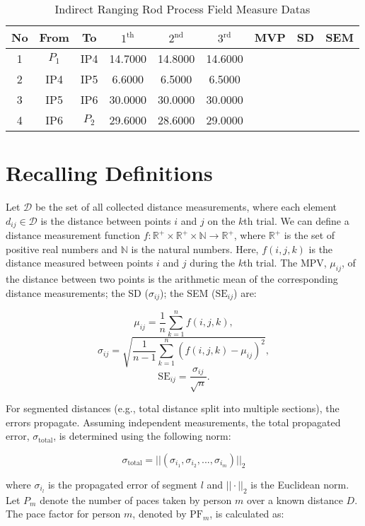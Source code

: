 \documentclass[12pt]{article}
\begin{document}
\begin{table}[ht!]
\centering
\begin{tabular}{ccccccccc}
\hline
No & From & To  & $1^{\operatorname{th}}$  & $2^{\operatorname{nd}}$  & $3^{\operatorname{rd}}$   & MVP & SD & SEM \\
\hline
1 & $P_1$ & IP4 & 14.7000 & 14.8000& 14.6000 &  &  &  \\
2 & IP4 & IP5 & 6.6000 & 6.5000 & 6.5000 &  &  &  \\
3 & IP5 & IP6 & 30.0000 & 30.0000 & 30.0000 &  &  &   \\
4 & IP6 & $P_2$ & 29.6000 & 28.6000 & 29.0000 &  &  &  \\
\hline
\end{tabular}
\caption{Indirect Ranging Rod Process Field Measure Datas} 
\end{table}


\section*{Recalling Definitions}

Let $\mathcal{D}$ be the set of all collected distance measurements, where each element $d_{ij} \in \mathcal{D}$ is the distance between points $i$ and $j$ on the $k$th trial. We can define a distance measurement function $f: \mathbb{R}^+ \times \mathbb{R}^+ \times \mathbb{N} \rightarrow \mathbb{R}^+$, where $\mathbb{R}^+$ is the set of positive real numbers and $\mathbb{N}$ is the natural numbers. Here, $f(i, j, k)$ is the distance measured between points $i$ and $j$ during the $k$th trial. The MPV, $\mu_{ij}$, of the distance between two points is the arithmetic mean of the corresponding distance measurements; the SD ($\sigma_{ij}$); the SEM ($\text{SE}_{ij}$) are:

$$\mu_{ij} = \frac{1}{n} \sum_{k=1}^{n} f(i, j, k),$$
$$\sigma_{ij} = \sqrt{\frac{1}{n-1} \sum_{k=1}^{n} (f(i, j, k) - \mu_{ij})^2},$$
$$\text{SE}_{ij} = \frac{\sigma_{ij}}{\sqrt{n}}.$$

For segmented distances (e.g., total distance split into multiple sections), the errors propagate. Assuming independent measurements, the total propagated error, $\sigma_{\text{total}}$, is determined using the following norm:

$$\sigma_{\text{total}} = ||(\sigma_{i_1}, \sigma_{i_2}, ..., \sigma_{i_m})||_2$$

where $\sigma_{i_l}$ is the propagated error of segment $l$ and $|| \cdot ||_2$ is the Euclidean norm. Let $P_m$ denote the number of paces taken by person $m$ over a known distance $D$. The pace factor for person $m$, denoted by $\text{PF}_m$, is calculated as:
\end{document}

